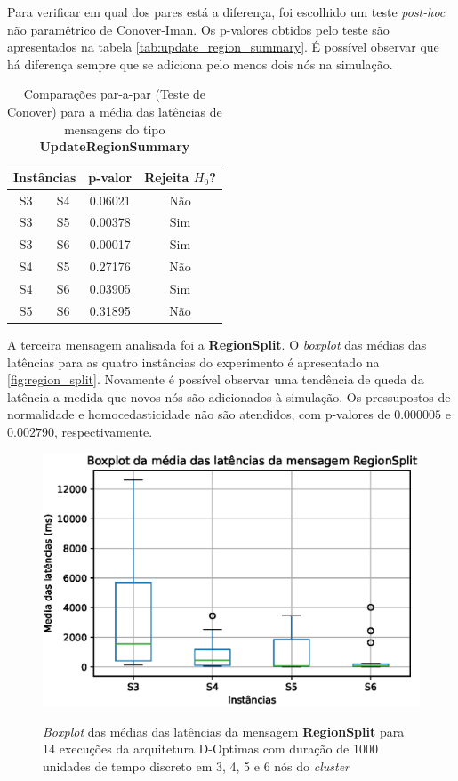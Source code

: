 Para verificar em qual dos pares está a diferença, foi escolhido um teste \textit{post-hoc} não paramêtrico de Conover-Iman. Os p-valores obtidos pelo teste são apresentados na tabela \autoref{tab:update_region_summary}. É possível observar que há diferença sempre que se adiciona pelo menos dois nós na simulação.

\begin{table}[ht!]
    \centering
    \caption{Comparações par-a-par (Teste de Conover) para a média das latências de mensagens do tipo \textbf{UpdateRegionSummary}}
    \begin{tabular}{cccc}
    \toprule
    \multicolumn{2}{c}{\textbf{Instâncias}} & \textbf{p-valor} & \textbf{Rejeita $H_0$?}\\
    \midrule
     S3 &    S4 &  0.06021 &  Não  \\
     S3 &    S5 &  0.00378 &   Sim \\
     S3 &    S6 &  0.00017 &   Sim \\
     S4 &    S5 &  0.27176 &  Não  \\
     S4 &    S6 &  0.03905 &   Sim \\
     S5 &    S6 &  0.31895 &  Não  \\
     \bottomrule
    \end{tabular}
    \label{tab:update_region_summary}
\end{table}

A terceira mensagem  analisada foi a \textbf{RegionSplit}. O \textit{boxplot} das médias das latências para as quatro instâncias do experimento é apresentado na \autoref{fig:region_split}. Novamente é possível observar uma tendência de queda da latência a medida que novos nós são adicionados à simulação. Os pressupostos de normalidade e homocedasticidade não são atendidos, com p-valores de $0.000005$ e $0.002790$, respectivamente.  

\begin{figure}
    \centering
    \caption{\textit{Boxplot} das médias das latências da mensagem \textbf{RegionSplit} para 14 execuções da arquitetura D-Optimas com duração de 1000 unidades de tempo discreto em 3, 4, 5 e 6 nós do \textit{cluster} }
    \includegraphics[scale=0.8]{imagens/region_split.eps}    \label{fig:region_split}
\end{figure}

